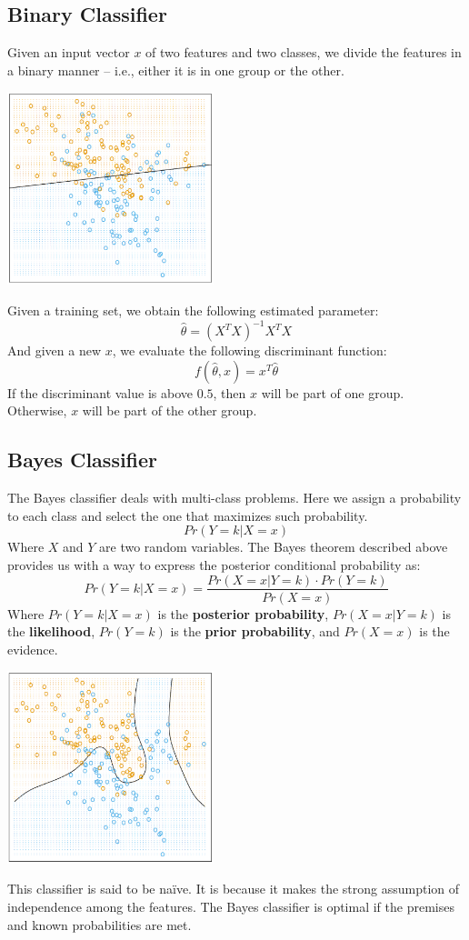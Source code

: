 \documentclass{article}
\begin{document}
\subsection{Binary Classifier}
Given an input vector $x$ of two features and two classes, we divide the features in a binary manner -- i.e., either it is in one group or the other.

\begin{center}
	\includegraphics[width=6cm]{binary_classification.png}
\end{center}
Given a training set, we obtain the following estimated parameter:
\[ \hat\theta = (X^TX)^{-1}X^TX \]
And given a new $x$, we evaluate the following discriminant function:
\[ f(\hat\theta, x) = x^T\hat\theta \]
If the discriminant value is above $0.5$, then $x$ will be part of one group. Otherwise, $x$ will be part of the other group.

\subsection{Bayes Classifier}
The Bayes classifier deals with multi-class problems. Here we assign a probability to each class and select the one that maximizes such probability.
\[ Pr(Y = k|X = x) \]
Where $X$ and $Y$ are two random variables. The Bayes theorem described above provides us with a way to express the posterior conditional probability as:
\[ Pr(Y = k|X = x) = \frac{Pr(X = x|Y = k) \cdot Pr(Y = k)}{Pr(X = x)} \]
Where $Pr(Y = k|X = x)$ is the \textbf{posterior probability}, $Pr(X = x|Y = k)$ is the \textbf{likelihood}, $Pr(Y = k)$ is the \textbf{prior probability}, and $Pr(X = x)$ is the evidence.

\begin{center}
	\includegraphics[width=6cm]{bayes_classification.png}
\end{center}
This classifier is said to be na\"ive. It is because it makes the strong assumption of independence among the features. The Bayes classifier is optimal if the premises and known probabilities are met.
\end{document}
